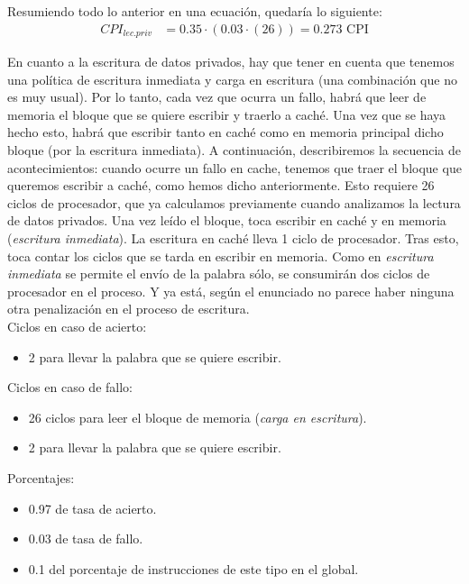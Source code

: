 \documentclass[12pt,a4paper]{article}
\begin{document}
Resumiendo todo lo anterior en una ecuación, quedaría lo siguiente:
\begin{align*}
CPI_{lec.priv}&=0.35\cdot (0.03\cdot (26))=0.273\text{ CPI}
\end{align*}

En cuanto a la escritura de datos privados, hay que tener en cuenta que tenemos una política de escritura inmediata y carga en escritura (una combinación que no es muy usual). Por lo tanto, cada vez que ocurra un fallo, habrá que leer de memoria el bloque que se quiere escribir y traerlo a caché. Una vez que se haya hecho esto, habrá que escribir tanto en caché como en memoria principal dicho bloque (por la escritura inmediata). A continuación, describiremos la secuencia de acontecimientos: cuando ocurre un fallo en cache, tenemos que traer el bloque que queremos escribir a caché, como hemos dicho anteriormente. Esto requiere 26 ciclos de procesador, que ya calculamos previamente cuando analizamos la lectura de datos privados. Una vez leído el bloque, toca escribir en caché y en memoria (\textit{escritura inmediata}). La escritura en caché lleva 1 ciclo de procesador. Tras esto, toca contar los ciclos que se tarda en escribir en memoria. Como en \textit{escritura inmediata} se permite el envío de la palabra sólo, se consumirán dos ciclos de procesador en el proceso. Y ya está, según el enunciado no parece haber ninguna otra penalización en el proceso de escritura.\\

Ciclos en caso de acierto:
\begin{itemize}
\item 2 para llevar la palabra que se quiere escribir.
\end{itemize}

Ciclos en caso de fallo:
\begin{itemize}
\item 26 ciclos para leer el bloque de memoria (\textit{carga en escritura}).
\item 2 para llevar la palabra que se quiere escribir.
\end{itemize}

Porcentajes:
\begin{itemize}
\item 0.97 de tasa de acierto.
\item 0.03 de tasa de fallo.
\item 0.1 del porcentaje de instrucciones de este tipo en el global.
\end{itemize}
\end{document}
